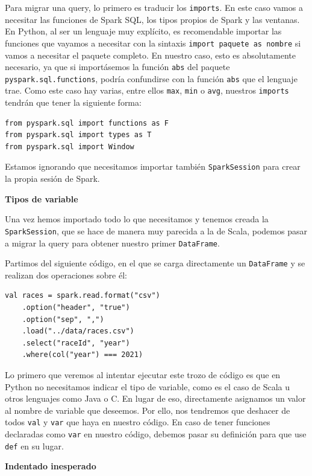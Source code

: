 \documentclass[12pt,twoside,titlepage]{report}
\begin{document}
Para migrar una query, lo primero es traducir los \texttt{imports}. En este caso vamos a necesitar las funciones de Spark SQL, los tipos propios de Spark y las ventanas. En Python, al ser un lenguaje muy explícito, es recomendable importar las funciones que vayamos a necesitar con la sintaxis \texttt{import {paquete} as {nombre}} si vamos a necesitar el paquete completo. En nuestro caso, esto es absolutamente necesario, ya que si importásemos la función \texttt{abs} del paquete \texttt{pyspark.sql.functions}, podría confundirse con la función \texttt{abs} que el lenguaje trae. Como este caso hay varias, entre ellos \texttt{max}, \texttt{min} o \texttt{avg}, nuestros \texttt{imports} tendrán que tener la siguiente forma:

\begin{lstlisting}
from pyspark.sql import functions as F
from pyspark.sql import types as T
from pyspark.sql import Window
\end{lstlisting}

Estamos ignorando que necesitamos importar también \texttt{SparkSession} para crear la propia sesión de Spark.

\textbf{Tipos de variable}

Una vez hemos importado todo lo que necesitamos y tenemos creada la \texttt{SparkSession}, que se hace de manera muy parecida a la de Scala, podemos pasar a migrar la query para obtener nuestro primer \texttt{DataFrame}.

Partimos del siguiente código, en el que se carga directamente un \texttt{DataFrame} y se realizan dos operaciones sobre él:

\begin{lstlisting}
val races = spark.read.format("csv")
	.option("header", "true")
	.option("sep", ",")
	.load("../data/races.csv")
	.select("raceId", "year")
	.where(col("year") === 2021)
\end{lstlisting}

Lo primero que veremos al intentar ejecutar este trozo de código es que en Python no necesitamos indicar el tipo
de variable, como es el caso de Scala u otros lenguajes como Java o C. En lugar de eso, directamente asignamos un valor al nombre de variable que deseemos. Por ello, nos tendremos que deshacer de todos \texttt{val} y \texttt{var} que haya en nuestro código. En caso de tener funciones declaradas como \texttt{var} en nuestro código, debemos pasar su definición para que use \texttt{def} en su lugar.

\textbf{Indentado inesperado}
\end{document}
